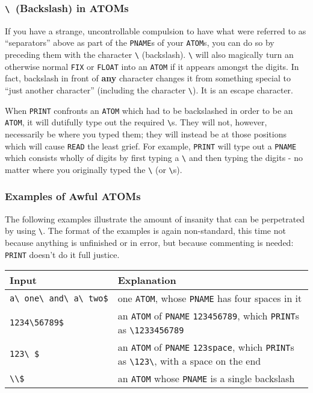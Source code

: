 \documentclass[a4paper]{scrbook}
\begin{document}
\subsubsection{\texttt{\textbackslash{}}~(Backslash) in ATOMs}\label{backslash-in-atoms}

If you have a strange, uncontrollable compulsion to have what were referred to as ``separators'' above as part of the
\texttt{PNAME}s of your \texttt{ATOM}s, you can do so by preceding them with the character
\texttt{\textbackslash{}} (backslash). \texttt{\textbackslash{}} will also
magically turn an otherwise normal \texttt{FIX} or \texttt{FLOAT} into an \texttt{ATOM} if it appears amongst the digits.
In fact, backslash in front of \textbf{any} character changes it from something special to ``just another character''
(including the character \texttt{\textbackslash{}}). It is an escape character.

When \texttt{PRINT} confronts an \texttt{ATOM} which had to be backslashed in order to be an \texttt{ATOM}, it will
dutifully type out the required \texttt{\textbackslash{}}s. They will not, however, necessarily be where you typed them;
they will instead be at those positions which will cause \texttt{READ} the least grief. For example, \texttt{PRINT} will
type out a \texttt{PNAME} which consists wholly of digits by first typing a \texttt{\textbackslash{}} and then typing the
digits - no matter where you originally typed the \texttt{\textbackslash{}} (or \texttt{\textbackslash{}}s).

\subsubsection{Examples of Awful ATOMs}\label{examples-of-awful-atoms}

The following examples illustrate the amount of insanity that can be perpetrated by using \texttt{\textbackslash{}}. The
format of the examples is again non-standard, this time not because anything is unfinished or in error, but because
commenting is needed: \texttt{PRINT} doesn't do it full justice.

\begin{longtable}[]{@{}ll@{}}
\toprule
Input & Explanation\tabularnewline
\midrule
\endhead
\texttt{a\textbackslash{}\ one\textbackslash{}\ and\textbackslash{}\ a\textbackslash{}\ two\$} & one \texttt{ATOM}, whose
\texttt{PNAME} has four spaces in it\tabularnewline
\texttt{1234\textbackslash{}56789\$} & an \texttt{ATOM} of \texttt{PNAME} \texttt{123456789}, which \texttt{PRINT}s as
\texttt{\textbackslash{}1233456789}\tabularnewline
\texttt{123\textbackslash{}\ \$} & an \texttt{ATOM} of \texttt{PNAME} \texttt{123space}, which \texttt{PRINT}s as
\texttt{\textbackslash{}123\textbackslash{}}, with a space on the end\tabularnewline
\texttt{\textbackslash{}\textbackslash{}\$} & an \texttt{ATOM} whose \texttt{PNAME} is a single backslash\tabularnewline
\bottomrule
\end{longtable}
\end{document}
